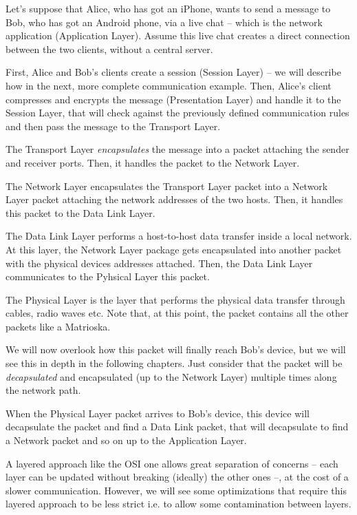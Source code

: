 Let's suppose that Alice, who has got an iPhone, wants to send a message to Bob, who has got an Android phone, via a live chat -- which is the network application (Application Layer). Assume this live chat creates a direct connection between the two clients, without a central server.

First, Alice and Bob's clients create a session (Session Layer) -- we will describe how in the next, more complete communication example.
Then, Alice's client compresses and encrypts the message (Presentation Layer) and handle it to the Session Layer, that will check against the previously defined communication rules and then pass the message to the Transport Layer.

The Transport Layer \emph{encapsulates} the message into a packet attaching the sender and receiver ports. Then, it handles the packet to the Network Layer.

The Network Layer encapsulates the Transport Layer packet into a Network Layer packet attaching the network addresses of the two hosts. Then, it handles this packet to the Data Link Layer.

The Data Link Layer performs a host-to-host data transfer inside a local network. At this layer, the Network Layer package gets encapsulated into another packet with the physical devices addresses attached. Then, the Data Link Layer communicates to the Pyhsical Layer this packet.

The Physical Layer is the layer that performs the physical data transfer through cables, radio waves etc.
Note that, at this point, the packet contains all the other packets like a Matrioska.

We will now overlook how this packet will finally reach Bob's device, but we will see this in depth in the following chapters. Just consider that the packet will be \emph{decapsulated} and encapsulated (up to the Network Layer) multiple times along the network path.

When the Physical Layer packet arrives to Bob's device, this device will decapsulate the packet and find a Data Link packet, that will decapsulate to find a Network packet and so on up to the Application Layer.

A layered approach like the OSI one allows great separation of concerns -- each layer can be updated without breaking (ideally) the other ones --, at the cost of a slower communication.
However, we will see some optimizations that require this layered approach to be less strict i.e. to allow some contamination between layers.

